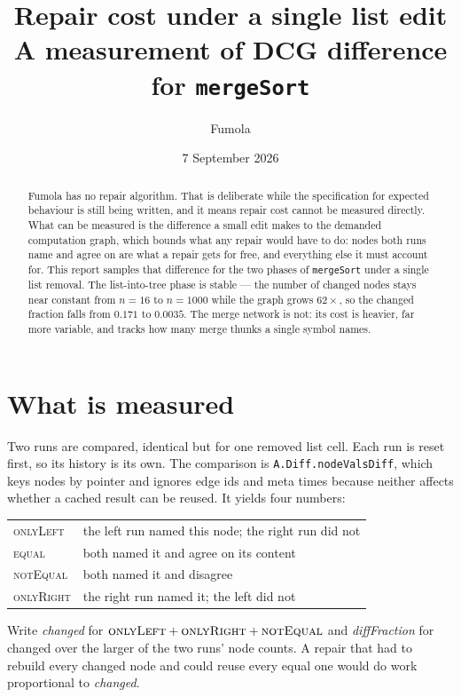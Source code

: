 \documentclass[11pt,a4paper]{article}
\title{Repair cost under a single list edit\\[2pt]
  \large A measurement of DCG difference for \texttt{mergeSort}}
\author{Fumola}
\date{7 September 2026}
\begin{document}
\maketitle

\begin{abstract}
\noindent
Fumola has no repair algorithm. That is deliberate while the specification for
expected behaviour is still being written, and it means repair cost cannot be
measured directly. What can be measured is the difference a small edit makes to
the demanded computation graph, which bounds what any repair would have to do:
nodes both runs name and agree on are what a repair gets for free, and
everything else it must account for. This report samples that difference for
the two phases of \texttt{mergeSort} under a single list removal. The
list-into-tree phase is stable --- the number of changed nodes stays near
constant from $n=16$ to $n=1000$ while the graph grows $62\times$, so the
changed fraction falls from $0.171$ to $0.0035$. The merge network is not:
its cost is heavier, far more variable, and tracks how many merge thunks a
single symbol names.
\end{abstract}

\section{What is measured}

Two runs are compared, identical but for one removed list cell. Each run is
reset first, so its history is its own. The comparison is
\texttt{A.Diff.nodeValsDiff}, which keys nodes by pointer and ignores edge ids
and meta times because neither affects whether a cached result can be reused.
It yields four numbers:

\begin{center}
\begin{tabular}{ll}
\toprule
\textsc{onlyLeft}  & the left run named this node; the right run did not \\
\textsc{equal}     & both named it and agree on its content \\
\textsc{notEqual}  & both named it and disagree \\
\textsc{onlyRight} & the right run named it; the left did not \\
\bottomrule
\end{tabular}
\end{center}

\noindent
Write \emph{changed} for $\textsc{onlyLeft}+\textsc{onlyRight}+\textsc{notEqual}$
and \emph{diffFraction} for changed over the larger of the two runs' node
counts. A repair that had to rebuild every changed node and could reuse every
equal one would do work proportional to \emph{changed}.
\end{document}
